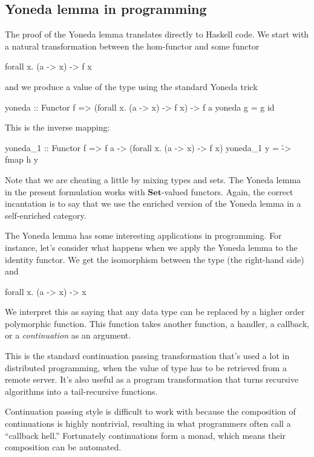 \documentclass[DaoFP]{subfiles}
\begin{document}
\subsection{Yoneda lemma in programming}

The proof of the Yoneda lemma translates directly to Haskell code. We start with a natural transformation between the hom-functor  and some functor 
\begin{haskell}
forall x. (a -> x) -> f x
\end{haskell}
and we produce a value of the type  using the standard Yoneda trick
\begin{haskell}
yoneda :: Functor f => (forall x. (a -> x) -> f x) -> f a
yoneda g = g id
\end{haskell}
This is the inverse mapping:
\begin{haskell}
yoneda_1 :: Functor f => f a -> (forall x. (a -> x) -> f x)
yoneda_1 y = \h -> fmap h y
\end{haskell}

Note that we are cheating a little by mixing types and sets. The Yoneda lemma in the present formulation works with  $\mathbf{Set}$-valued functors. Again, the correct incantation is to say that we use the enriched version of the Yoneda lemma in a self-enriched category.

The Yoneda lemma has some interesting applications in programming. For instance, let's consider what happens when we apply the Yoneda lemma to the identity functor. We get the isomorphism between the type  (the right-hand side) and
\begin{haskell}
forall x. (a -> x) -> x
\end{haskell}
We interpret this as saying that any data type  can be replaced by a higher order polymorphic function. This function takes another function, a handler, a callback, or a \emph{continuation} as an argument. 

This is the standard continuation passing transformation that's used a lot in distributed programming, when the value of type  has to be retrieved from a remote server. It's also useful as a program transformation that turns recursive algorithms into a tail-recursive functions.

Continuation passing style is difficult to work with because the composition of continuations is highly nontrivial, resulting in what programmers often call a ``callback hell.'' Fortunately continuations form a monad, which means their composition can be automated.
\end{document}

